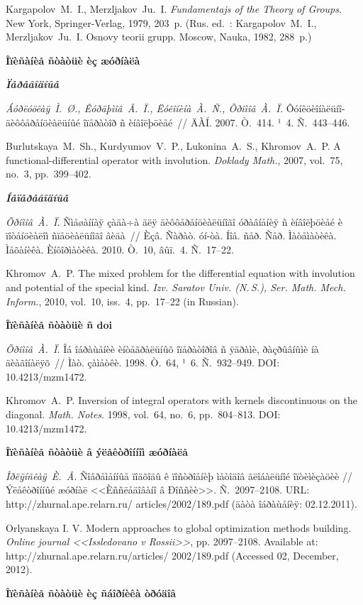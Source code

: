 \documentclass[12pt]{book}
\theoremstyle{plain}
\theoremstyle{remark}
\theoremstyle{plain}
\theoremstyle{definition}
\begin{document}
Kargapolov~M.~I., Merzljakov~Ju.~I. \textit{Fundamentajs of
the Theory of Groups}. New York, Springer-Verlag, 1979, 203~p.
(Rus. ed.~: Kargapolov~M.~I., Merzljakov~Ju.~I. Osnovy teorii
grupp. Moscow, Nauka, 1982,  288~p.)


\textbf{Îïèñàíèå ñòàòüè èç æóðíàëà}

\textbf{\textit{Ïåðåâîäíûå}}

\textit{Áóðëóöêàÿ~Ì.~Ø., Êóðäþìîâ~Â.~Ï., Ëóêîíèíà~À.~Ñ.,
Õðîìîâ~À.~Ï.} Ôóíêöèîíàëüíî-äèôôåðåíöèàëüíûé îïåðàòîð ñ
èíâîëþöèåé~// ÄÀÍ. 2007. Ò.~414. ¹~4. Ñ.~443--446.

Burlutskaya~M.~Sh., Kurdyumov~V.~P., Lukonina~A.~S.,
Khromov~A.~P. A func\-tio\-nal-differential operator with
involution. \textit{Doklady Math.}, 2007,  vol.~75, no.~3,
pp.~399--402.


{\textbf{\textit{Íåïåðåâîäíûå}}}

\textit{Õðîìîâ~À.~Ï.} Ñìåøàííàÿ çàäà÷à äëÿ äèôôåðåíöèàëüíîãî
óðàâíåíèÿ ñ èíâîëþöèåé è ïîòåíöèàëîì ñïåöèàëüíîãî âèäà~// Èçâ.
Ñàðàò. óí-òà. Íîâ. ñåð. Ñåð. Ìàòåìàòèêà. Ìåõàíèêà. Èíôîðìàòèêà.
2010. Ò.~10, âûï.~4. Ñ.~17--22.

Khromov~A.~P. The mixed problem for the differential equation
with involution and potential of the special kind. \textit{Izv.
Saratov Univ. (N.\,S.), Ser. Math. Mech. Inform.}, 2010,  vol.~10,
iss.~4, pp.~17--22 (in Russian).

{\textbf{Îïèñàíèå ñòàòüè ñ doi}}

\textit{Õðîìîâ~À.~Ï.} Îá îáðàùåíèè èíòåãðàëüíûõ îïåðàòîðîâ ñ
ÿäðàìè, ðàçðûâíûìè íà äèàãîíàëÿõ~// Ìàò. çàìåòêè. 1998. Ò.~64,
¹~6. Ñ.~932--949. DOI: 10.4213/mzm1472.

Khromov~A.~P. Inversion of integral operators with kernels
discontinuous on the diagonal. \textit{Math. Notes}. 1998,
vol.~64, no.~6, pp.~804--813. DOI: 10.4213/mzm1472.

\textbf{Îïèñàíèå ñòàòüè â ýëåêòðîííîì
æóðíàëå}

\textit{Îðëÿíñêàÿ~È.~Â.} Ñîâðåìåííûå ïîäõîäû ê ïîñòðîåíèþ
ìåòîäîâ ãëîáàëüíîé îïòèìèçàöèè // Ýëåêòðîííûé æóðíàë <<Èññëåäîâàíî
â Ðîññèè>>. Ñ.~2097--2108. URL: http://zhurnal.ape.relarn.ru/
articles/2002/189.pdf  (äàòà îáðàùåíèÿ: 02.12.2011).

Orlyanskaya I. V. Modern approaches to global optimization
methods building. \textit{Online journal <<Issledovano v
Rossii>>}, pp. 2097--2108. Available at:
http://zhurnal.ape.relarn.ru/articles/ 2002/189.pdf (Accessed 02,
December, 2012).

\textbf{Îïèñàíèå ñòàòüè èç ñáîðíèêà òðóäîâ}
\end{document}

